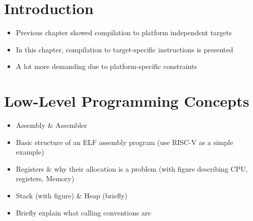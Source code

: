 \section{Introduction}

\begin{itemize}
	\item Previous chapter showed compilation to platform independent targets
	\item In this chapter, compilation to target-specific instructions is presented
	\item A lot more demanding due to platform-specific constraints
\end{itemize}

\section{Low-Level Programming Concepts}

\begin{itemize}
    \item Assembly \& Assembler~\cite[p.~5-6]{Dandamudi2005} %
    \item Basic structure of an ELF assembly program (use RISC-V as a simple example)~\cite[p.~35]{Patterson2017}
    \item Registers \& why their allocation is a problem (with figure describing CPU, registers, Memory)~\cite[p.~10]{Patterson2017}
    \item Stack (with figure) \& Heap (briefly)~\cite[p.40]{Patterson2017}
	\item Briefly explain what calling conventions are~\cite[p.42]{Patterson2017}
\end{itemize}

